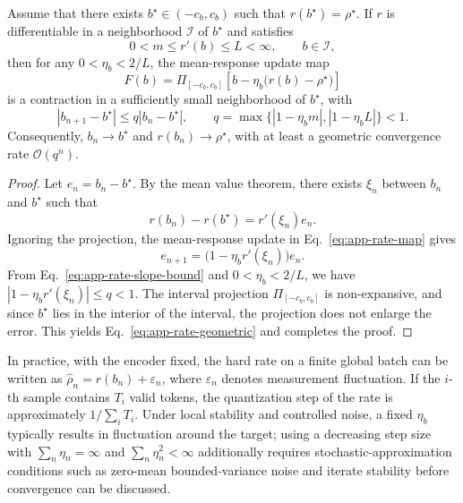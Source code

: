 \begin{lemma}
\label{lem:rate-control-convergence}
Assume that there exists $b^\star\in(-c_b,c_b)$ such that $r(b^\star)=\rho^\star$. If $r$ is differentiable in a neighborhood $\mathcal I$ of $b^\star$ and satisfies
\begin{equation}
    0<m\le r'(b)\le L<\infty,
    \qquad b\in\mathcal I,
    \label{eq:app-rate-slope-bound}
\end{equation}
then for any $0<\eta_b<2/L$, the mean-response update map
\begin{equation}
    F(b)=\Pi_{[-c_b,c_b]}\!\left[b-\eta_b\big(r(b)-\rho^\star\big)\right]
    \label{eq:app-rate-map}
\end{equation}
is a contraction in a sufficiently small neighborhood of $b^\star$, with
\begin{equation}
    |b_{n+1}-b^\star|
    \le q|b_n-b^\star|,
    \qquad
    q=\max\{|1-\eta_bm|,|1-\eta_bL|\}<1.
    \label{eq:app-rate-geometric}
\end{equation}
Consequently, $b_n\to b^\star$ and $r(b_n)\to\rho^\star$, with at least a geometric convergence rate $\mathcal O(q^n)$.
\end{lemma}

\begin{proof}
Let $e_n=b_n-b^\star$. By the mean value theorem, there exists $\xi_n$ between $b_n$ and $b^\star$ such that
\begin{equation}
    r(b_n)-r(b^\star)=r'(\xi_n)e_n.
\end{equation}
Ignoring the projection, the mean-response update in Eq.~\eqref{eq:app-rate-map} gives
\begin{equation}
    e_{n+1}
    =\big(1-\eta_br'(\xi_n)\big)e_n.
    \label{eq:app-rate-error}
\end{equation}
From Eq.~\eqref{eq:app-rate-slope-bound} and $0<\eta_b<2/L$, we have $|1-\eta_br'(\xi_n)|\le q<1$. The interval projection $\Pi_{[-c_b,c_b]}$ is non-expansive, and since $b^\star$ lies in the interior of the interval, the projection does not enlarge the error. This yields Eq.~\eqref{eq:app-rate-geometric} and completes the proof.
\end{proof}

In practice, with the encoder fixed, the hard rate on a finite global batch can be written as $\hat\rho_n=r(b_n)+\varepsilon_n$, where $\varepsilon_n$ denotes measurement fluctuation. If the $i$-th sample contains $T_i$ valid tokens, the quantization step of the rate is approximately $1/\sum_iT_i$. Under local stability and controlled noise, a fixed $\eta_b$ typically results in fluctuation around the target; using a decreasing step size with $\sum_n\eta_n=\infty$ and $\sum_n\eta_n^2<\infty$ additionally requires stochastic-approximation conditions such as zero-mean bounded-variance noise and iterate stability before convergence can be discussed.

